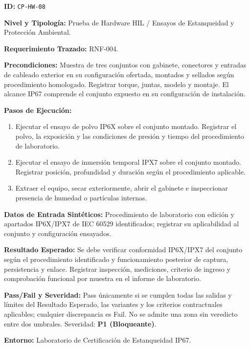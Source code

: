 \par\noindent \textbf{ID:} \texttt{CP-\allowbreak{}HW-\allowbreak{}08}\par
\par\noindent \textbf{Nivel y Tipología:} Prueba de Hardware HIL / Ensayos de Estanqueidad y Protección Ambiental.\par
\par\noindent \textbf{Requerimiento Trazado:} RNF-004.\par
\par\noindent \textbf{Precondiciones:} Muestra de tres conjuntos con gabinete, conectores y entradas de cableado exterior en su configuración ofertada, montados y sellados según procedimiento homologado. Registrar torque, juntas, modelo y montaje. El alcance IP67 comprende el conjunto expuesto en su configuración de instalación.\par
\par\noindent \textbf{Pasos de Ejecución:}\par
\begin{enumerate}
\item Ejecutar el ensayo de polvo IP6X sobre el conjunto montado. Registrar el polvo, la exposición y las condiciones de presión y tiempo del procedimiento de laboratorio.
\item Ejecutar el ensayo de inmersión temporal IPX7 sobre el conjunto montado. Registrar posición, profundidad y duración según el procedimiento aplicable.
\item Extraer el equipo, secar exteriormente, abrir el gabinete e inspeccionar presencia de humedad o partículas internas.
\end{enumerate}

\par\noindent \textbf{Datos de Entrada Sintéticos:} Procedimiento de laboratorio con edición y apartados IP6X/IPX7 de IEC 60529 identificados; registrar su aplicabilidad al conjunto y configuración ensayados.\par
\par\noindent \textbf{Resultado Esperado:} Se debe verificar conformidad IP6X/IPX7 del conjunto según el procedimiento identificado y funcionamiento posterior de captura, persistencia y enlace. Registrar inspección, mediciones, criterio de ingreso y comprobación funcional por muestra en el informe de laboratorio.\par
\par\noindent \textbf{Pass/Fail y Severidad:} Pass únicamente si se cumplen todas las salidas y límites del Resultado Esperado, las variantes y los criterios contractuales aplicables; cualquier discrepancia es Fail. No se admite una zona sin veredicto entre dos umbrales. Severidad: \textbf{P1 (Bloqueante)}.\par
\par\noindent \textbf{Entorno:} Laboratorio de Certificación de Estanqueidad IP67.\par

